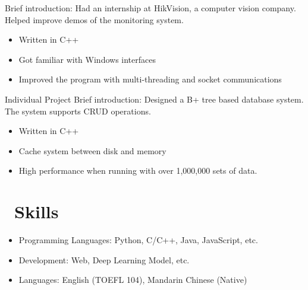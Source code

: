 \documentclass{resume}
\begin{document}

Brief introduction: Had an internship at HikVision, a computer vision company. Helped improve demos of the monitoring system.
\begin{itemize}
  \item Written in C++
  \item Got familiar with Windows interfaces
  \item Improved the program with multi-threading and socket communications
\end{itemize}


{Individual Project}
Brief introduction: Designed a B+ tree based database system. The system supports CRUD operations. 
\begin{itemize}
  \item Written in C++
  \item Cache system between disk and memory
  \item High performance when running with over 1,000,000 sets of data.
\end{itemize}


\section{\faCogs\ Skills}
\begin{itemize}[parsep=0.5ex]
  \item Programming Languages: Python, C/C++, Java, JavaScript, etc.
  \item Development: Web, Deep Learning Model, etc.
  \item Languages: English (TOEFL 104), Mandarin Chinese (Native)
\end{itemize}

%
%
\end{document}
